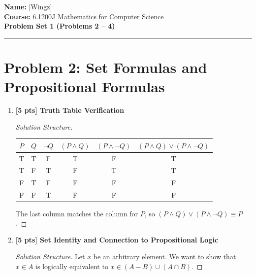 \documentclass[11pt]{article}
\begin{document}
\noindent
\textbf{Name:} [Wingz] \\
\textbf{Course:} 6.1200J Mathematics for Computer Science \\
\textbf{Problem Set 1 (Problems 2 -- 4)}
\hrule
\vspace{1em}

\section*{Problem 2: Set Formulas and Propositional Formulas}
\begin{enumerate}
    \item[(a)] \textbf{[5 pts] Truth Table Verification}
    
    \begin{proof}[Solution Structure]
        \begin{center}
        \small
        \begin{tabular}{|c|c|c|c|c|c|}
            \hline
            $P$ & $Q$ & $\neg Q$ & $(P \land Q)$ & $(P \land \neg Q)$ & $(P \land Q) \lor (P \land \neg Q)$ \\
            \hline
            T & T & F & T & F & T \\
            \hline
            T & F & T & F & T & T \\
            \hline
            F & T & F & F & F & F \\
            \hline
            F & F & T & F & F & F \\
            \hline
        \end{tabular}
        \end{center}
        The last column matches the column for $P$, so 
        $(P \land Q) \lor (P \land \neg Q) \equiv P$.
    \end{proof}

    \item[(b)] \textbf{[5 pts] Set Identity and Connection to Propositional Logic}
    
    \begin{proof}[Solution Structure]
        Let $x$ be an arbitrary element. We want to show that $x \in A$ is logically 
        equivalent to $x \in (A - B) \cup (A \cap B)$.
        

\end{proof}
\end{enumerate}
\end{document}
